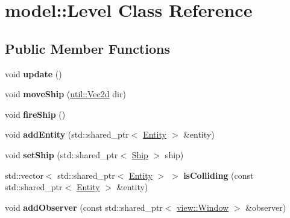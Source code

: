 \hypertarget{classmodel_1_1_level}{}\section{model\+:\+:Level Class Reference}
\label{classmodel_1_1_level}
\subsection*{Public Member Functions}
\begin{DoxyCompactItemize}
\item 
\mbox{\label{classmodel_1_1_level_a6a25e93b420ff09bcc238d852bbe3828}} 
void {\bfseries update} ()
\item 
\mbox{\label{classmodel_1_1_level_adfebcf6485cec8ddacd4f8a730ce20c2}} 
void {\bfseries move\+Ship} (\mbox{\hyperlink{classutil_1_1_vec2}{util\+::\+Vec2d}} dir)
\item 
\mbox{\label{classmodel_1_1_level_a2f5c5b77fcd3b00d1788edd42d10455f}} 
void {\bfseries fire\+Ship} ()
\item 
\mbox{\label{classmodel_1_1_level_a94fe7743c37e6ae7aa17be7d5e3642ca}} 
void {\bfseries add\+Entity} (std\+::shared\+\_\+ptr$<$ \mbox{\hyperlink{classmodel_1_1_entity}{Entity}} $>$ \&entity)
\item 
\mbox{\label{classmodel_1_1_level_a68fba62a2e8c9dfbb188df0e35e914e9}} 
void {\bfseries set\+Ship} (std\+::shared\+\_\+ptr$<$ \mbox{\hyperlink{classmodel_1_1_ship}{Ship}} $>$ ship)
\item 
\mbox{\label{classmodel_1_1_level_a9e0e5f7bc08ad5b707e991e008396cec}} 
std\+::vector$<$ std\+::shared\+\_\+ptr$<$ \mbox{\hyperlink{classmodel_1_1_entity}{Entity}} $>$ $>$ {\bfseries is\+Colliding} (const std\+::shared\+\_\+ptr$<$ \mbox{\hyperlink{classmodel_1_1_entity}{Entity}} $>$ \&entity)
\item 
\mbox{\label{classmodel_1_1_level_a040530d28503315b60025ca5f45341d6}} 
void {\bfseries add\+Observer} (const std\+::shared\+\_\+ptr$<$ \mbox{\hyperlink{classview_1_1_window}{view\+::\+Window}} $>$ \&observer)

\end{DoxyCompactItemize}
